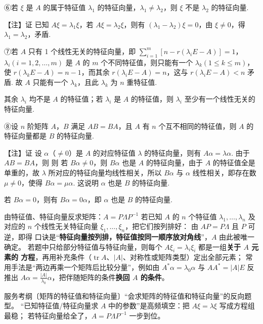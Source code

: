 ⑥若 $\xi$ 是 $A$ 的属于特征值 $\lambda_1$ 的特征向量，$\lambda_1\ne\lambda_2$，则 $\xi$ 不是 $\lambda_2$ 的特征向量.

\begin{fnote}
【注】证 已知 $A\xi=\lambda_1\xi$，若 $A\xi=\lambda_2\xi$，则有 $(\lambda_1-\lambda_2)\xi=0$，由 $\xi\ne0$，得 $\lambda_1=\lambda_2$，矛盾.
\end{fnote}

⑦若 $A$ 只有 1 个线性无关的特征向量，即 $\sum\limits_{i=1}^{m}[n-r(\lambda_iE-A)]=1$，$\lambda_i(i=1,2,\dots,m)$ 是 $A$ 的 $m$ 个不同特征值，则只能有一个 $\lambda_k(1\le k\le m)$，使 $r(\lambda_kE-A)=n-1$，而其余 $r(\lambda_iE-A)=n$，这与 $r(\lambda_iE-A)<n$ 矛盾. 故 $A$ 只能有一个 $\lambda_k$，且此 $\lambda_k$ 为 $n$ 重特征值.

\begin{fnote}
其余 $\lambda_i$ 均不是 $A$ 的特征值；若 $\lambda_i$ 是 $A$ 的特征值，则 $\lambda_i$ 至少有一个线性无关的特征向量.
\end{fnote}

⑧设 $n$ 阶矩阵 $A$，$B$ 满足 $AB=BA$，且 $A$ 有 $n$ 个互不相同的特征值，则 $A$ 的特征向量都是 $B$ 的特征向量.

\begin{fnote}
【注】证 设 $\alpha$（$\ne0$）是 $A$ 的对应特征值 $\lambda$ 的特征向量，则有 $A\alpha=\lambda\alpha$. 由于 $AB=BA$，则
则
若 $B\alpha\ne0$，则 $B\alpha$ 也是 $A$ 的特征向量，由于 $A$ 的特征值全是单重的，故 $\lambda$ 所对应的特征向量均线性相关，所以 $B\alpha$ 与 $\alpha$ 线性相关，即存在数 $\mu\ne0$，使得 $B\alpha=\mu\alpha$. 这说明 $\alpha$ 也是 $B$ 的特征向量.

若 $B\alpha=0$，则有 $B\alpha=0\alpha$，即 $\alpha$ 也是 $B$ 的特征向量.
\end{fnote}


\begin{fdeep}{由特征值、特征向量反求矩阵：$A=P\Lambda P^{-1}$}
若已知 $A$ 的 $n$ 个特征值 $\lambda_1,\dots,\lambda_n$ 及对应的 $n$ 个线性无关特征向量
$\xi_1,\dots,\xi_n$，把它们按列排好：
由 $AP=P\Lambda$ 且 $P$ 可逆，即得
口诀是“\textbf{特征向量按列排，特征值按同一顺序放对角线}”，$A$ 由此被唯一确定。
若题中只给部分特征值与特征向量，则每个 $A\xi_i=\lambda_i\xi_i$ 都是一组\textbf{关于 $A$ 元素的
方程}，再用补充条件（$\operatorname{tr}A$、$\lvert A\rvert$、对称性或矩阵类型）定出全部元素；
常用手法是“两边再乘一个矩阵后比较分量”，例如由 $A^{*}\alpha=\lambda_0\alpha$ 与 $AA^{*}=\lvert A\rvert E$
反推出 $A\alpha=\frac{\lvert A\rvert}{\lambda_0}\alpha$，把伴随矩阵的条件\textbf{换回 $A$ 的条件}。

\fbref{}服务考纲〔矩阵的特征值和特征向量〕“会求矩阵的特征值和特征向量”的反向题型。
“已知特征值/特征向量求 $A$ 中的参数”是高频填空：把 $A\xi=\lambda\xi$ 写成方程组最稳；
若特征向量给全了，$A=P\Lambda P^{-1}$ 一步到位。
\end{fdeep}

